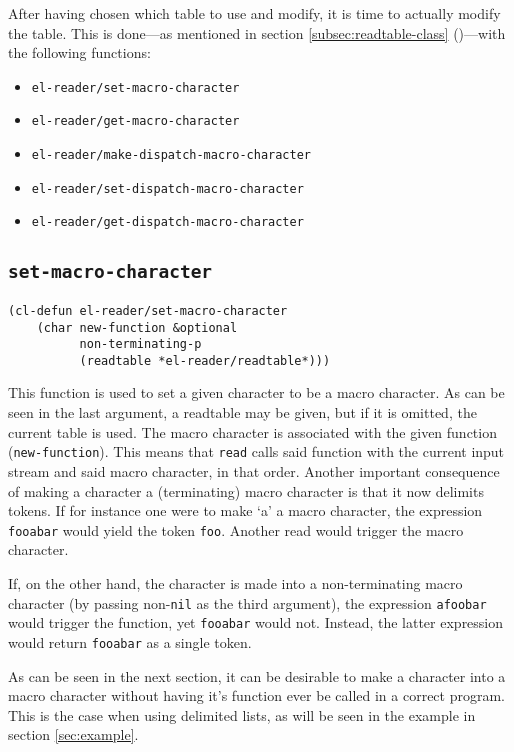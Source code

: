 \documentclass[a4paper,10pt,twoside]{report}
\newcommand{\sym}[1]{\texttt{#1}}
\newcommand{\fun}[1]{\texttt{#1}}
\newcommand{\Read}{\fun{read}}
\newcommand{\nil}{\sym{nil}}
\begin{document}
After having chosen which table to use and modify, it is time to actually modify
the table.  This is done---as mentioned in section \ref{subsec:readtable-class}
()---with the following functions:

\begin{itemize}
\item \fun{el-reader/set-macro-character} 
\item \fun{el-reader/get-macro-character}
\item \fun{el-reader/make-dispatch-macro-character}
\item \fun{el-reader/set-dispatch-macro-character}
\item \fun{el-reader/get-dispatch-macro-character}
\end{itemize}

\subsection{\fun{set-macro-character}}
\label{subsec:set-macro-character}

\begin{lstlisting}[style=lispinline]
(cl-defun el-reader/set-macro-character
    (char new-function &optional
          non-terminating-p
          (readtable *el-reader/readtable*)))
\end{lstlisting}

This function is used to set a given character to be a macro character.  As can
be seen in the last argument, a readtable may be given, but if it is omitted,
the current table is used.  The macro character is associated with the given
function (\fun{new-function}).  This means that \Read{} calls said function with
the current input stream and said macro character, in that order.  Another
important consequence of making a character a (terminating) macro character is
that it now delimits tokens.  If for instance one were to make `a' a macro
character, the expression \texttt{fooabar} would yield the token \texttt{foo}.
Another read would trigger the macro character.

If, on the other hand, the character is made into a non-terminating macro
character (by passing non-\nil{} as the third argument), the expression
\texttt{afoobar} would trigger the function, yet \texttt{fooabar} would not.
Instead, the latter expression would return \texttt{fooabar} as a single token.

As can be seen in the next section, it can be desirable to make a character into
a macro character without having it’s function ever be called in a correct
program.  This is the case when using delimited lists, as will be seen in the
example in section \ref{sec:example}.
\end{document}
